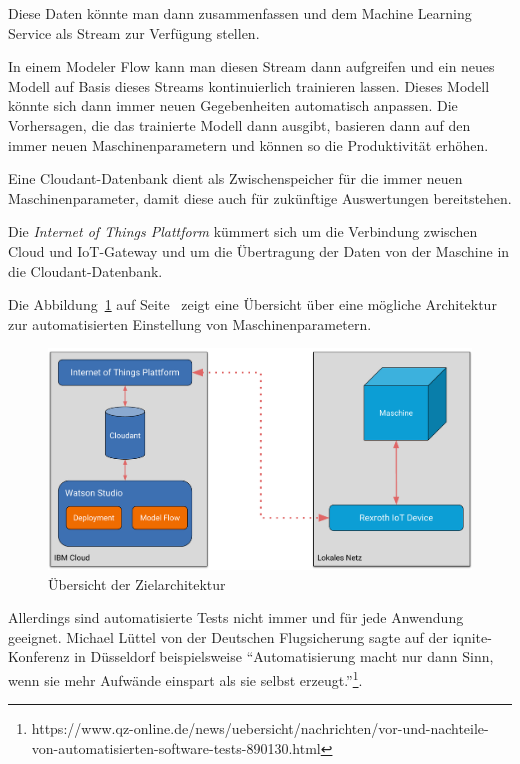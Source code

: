 Diese Daten könnte man dann zusammenfassen und dem Machine Learning Service als Stream zur Verfügung stellen.

In einem Modeler Flow kann man diesen Stream dann aufgreifen und ein neues Modell auf Basis dieses Streams
kontinuierlich trainieren lassen. Dieses Modell könnte sich dann immer neuen Gegebenheiten automatisch anpassen. Die
Vorhersagen, die das trainierte Modell dann ausgibt, basieren dann auf den immer neuen Maschinenparametern und können
so die Produktivität erhöhen.

Eine Cloudant-Datenbank dient als Zwischenspeicher für die immer neuen Maschinenparameter, damit diese auch für
zukünftige Auswertungen bereitstehen.

Die \textit{Internet of Things Plattform} kümmert sich um die Verbindung zwischen Cloud und IoT-Gateway und um die
Übertragung der Daten von der Maschine in die Cloudant-Datenbank.

Die Abbildung~\ref{fig:ausblick_uebersicht} auf Seite~\pageref{fig:ausblick_uebersicht} zeigt eine Übersicht über eine
mögliche Architektur zur automatisierten Einstellung von Maschinenparametern.

\begin{figure}[h]
    \centering
    \includegraphics[width=\textwidth]{images/kapitel_6/architektur_uebersicht.pdf}
    \caption{Übersicht der Zielarchitektur}
    \label{fig:ausblick_uebersicht}
\end{figure}

Allerdings sind automatisierte Tests nicht immer und für jede Anwendung geeignet. Michael Lüttel von der Deutschen
Flugsicherung sagte auf der iqnite-Konferenz in Düsseldorf beispielsweise \enquote{Automatisierung macht nur dann Sinn,
wenn sie mehr Aufwände einspart als sie selbst
erzeugt.}\footnote{https://www.qz-online.de/news/uebersicht/nachrichten/vor-und-nachteile-von-automatisierten-software-tests-890130.html}.

